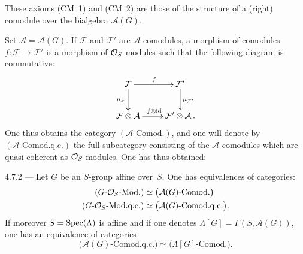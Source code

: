 These axioms (CM~1) and (CM~2) are those of the structure of a (right)
comodule%
{\renewcommand{\thefootnote}{(41)}}
over the bialgebra \(\mathcal{A}(G)\).

Set \(\mathcal{A} = \mathcal{A}(G)\). If \(\mathcal{F}\) and \(\mathcal{F}'\)
are \(\mathcal{A}\)-comodules, a morphism of comodules
\(f \colon \mathcal{F} \to \mathcal{F}'\) is a morphism of \(\mathcal{O}_S\)-modules such
that the following diagram is commutative:
\[
\xymatrix{
\mathcal{F} \ar[r]^{f} \ar[d]_{\mu_{\mathcal{F}}}
  & \mathcal{F}' \ar[d]^{\mu_{\mathcal{F}'}} \\
\mathcal{F} \otimes \mathcal{A} \ar[r]^{f\otimes\mathrm{id}}
  & \mathcal{F}' \otimes \mathcal{A}\,.
}
\]
One thus obtains the category \((\mathcal{A}\text{-}\mathrm{Comod.})\), and
one will denote by \((\mathcal{A}\text{-}\mathrm{Comod.q.c.})\) the full
subcategory consisting of the \(\mathcal{A}\)-comodules which are
quasi-coherent as \(\mathcal{O}_S\)-modules.
One has thus obtained:

\begin{proposition}{4.7.2}\label{I.4.7.2}
--- Let \(G\) be an \(S\)-group affine over~\(S\). One has equivalences of
categories:
\begin{align*}
(G\text{-}\mathcal{O}_S\text{-Mod.})
  &\simeq \bigl(\mathcal{A}(G)\text{-}\mathrm{Comod.}\bigr) \\
(G\text{-}\mathcal{O}_S\text{-Mod.q.c.})
  &\simeq \bigl(\mathcal{A}(G)\text{-}\mathrm{Comod.q.c.}\bigr).
\end{align*}
{\renewcommand{\thefootnote}{(42)}}
If moreover \(S = \operatorname{Spec}(\Lambda)\) is affine and if one denotes
\(\Lambda[G] = \Gamma(S, \mathcal{A}(G))\), one has an equivalence of
categories
\[
\bigl(\mathcal{A}(G)\text{-}\mathrm{Comod.q.c.}\bigr)
\simeq \bigl(\Lambda[G]\text{-}\mathrm{Comod.}\bigr).
\]
\end{proposition}

